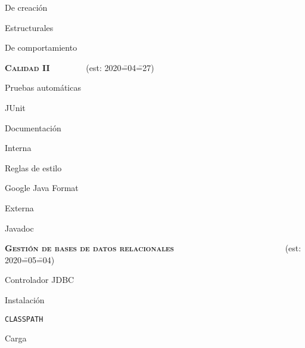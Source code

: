 \begin{longenum}
\begin{longenum}
        \begin{longenum}
            \item De creación
            \item Estructurales
            \item De comportamiento
        \end{longenum}
    \end{longenum}
    \item \textbf{\textsc{Calidad II}} \ \ \ \ \ \ \ \ (est: 2020\==04\==27)
    \begin{longenum}
        \item Pruebas automáticas
        \begin{longenum}
            \item JUnit
        \end{longenum}
        \item Documentación
        \begin{longenum}
            \item Interna
            \begin{longenum}
                \item Reglas de estilo
                \item Google Java Format
            \end{longenum}
            \item Externa
            \begin{longenum}
                \item Javadoc
            \end{longenum}
        \end{longenum}
    \end{longenum}
    \item \textbf{\textsc{Gestión de bases de datos relacionales}} \ \ \ \ \ \ \ \ \ \ \ \ \ \ \ \ \ \ \ \ \ \ \ \ \ \ (est: 2020\==05\==04)
    \begin{longenum}
        \item Controlador JDBC
        \begin{longenum}
            \item Instalación
            \item \texttt{CLASSPATH}
            \item Carga
        \end{longenum}

\end{longenum}
\end{longenum}
